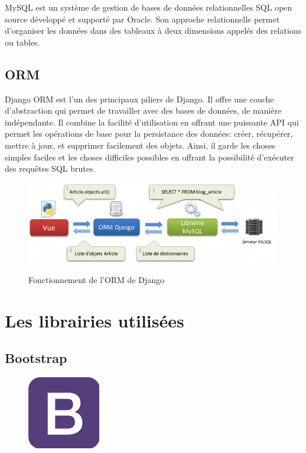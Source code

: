 MySQL est un système de gestion de bases de données relationnelles SQL open 
source développé et supporté par Oracle. Son approche relationnelle permet 
d'organiser les données dans des tableaux à deux dimensions appelés des 
relations ou tables\cite{47}.

\subsection{ORM}
Django ORM est l'un des principaux piliers de Django. Il offre une couche
d'abstraction qui permet de travailler avec des bases de données, de manière
indépendante. Il combine la facilité d'utilisation en offrant une puissante API
qui permet les opérations de base pour la persistance des données: créer,
récupérer, mettre à jour, et supprimer facilement des objets. Ainsi, il garde
les choses simples faciles et les choses difficiles possibles en offrant la
possibilité d’exécuter des requêtes SQL brutes\cite{48}.

\begin{figure}[h!]
    \centering
    \includegraphics[scale=0.8 ]{images/ORM.png}
    \label{fig77}
    \caption{Fonctionnement de l'ORM de Django}
    \label{}
\end{figure}

\clearpage       

\section{Les librairies utilisées}
\subsection{Bootstrap}
\begin{figure}
    \vspace{-22pt}
    \begin{center}
        \includegraphics[scale=0.36]{images/logo/bootstrap.png}
        \label{fig78}
    \end{center}
    \vspace{-20pt}
    \vspace{-10pt}
\end{figure}

